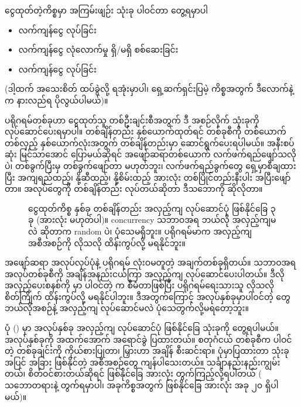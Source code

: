 ငွေထုတ်တဲ့ကိစ္စမှာ အကြမ်းဖျဉ်း  သုံးခု ပါဝင်တာ တွေ့ရမှာပါ 
%
\begin{itemize}
    \item လက်ကျန်ငွေ  လုပ်ခြင်း
    \item လက်ကျန်ငွေ လုံလောက်မှု ရှိ/မရှိ စစ်ဆေးခြင်း
    \item လက်ကျန်ငွေ  လုပ်ခြင်း
\end{itemize}
%
(ဒါ့ထက် အသေးစိတ် ထပ်ခွဲလို့ ရအုံးမှာပါ၊ ရှေ့ဆက်ရှင်းပြမဲ့ ကိစ္စအတွက် ဒီလောက်နဲ့က နားလည်ရ ပိုလွယ်ပါမယ်)။

 ပရိုဂရမ်တစ်ခုဟာ ငွေထုတ်သူ တစ်ဦးချင်းစီအတွက် ဒီ အစဉ်လိုက်  သုံးခုကို လုပ်ဆောင်ပေးရမှာပါ။ တစ်ချိန်တည်း နှစ်ယောက်ထုတ်ရင်  တစ်ခုစီကို တစ်ယောက် တစ်လှည့် နှစ်ယောက်လုံးအတွက် တစ်ချိန်တည်းမှာ ဆောင်ရွက်ပေးရပါမယ်။ အနီးစပ်ဆုံး မြင်သာအောင် ပြောမယ်ဆိုရင်  အဖျော်ဆရာတစ်ယောက် လက်ဖက်ရည်ဖျော်သလိုပဲ၊ တစ်ခွက်ပြီးမှ တစ်ခွက်ဖျော်တာ မဟုတ်ဘူး၊ လက်ဖက်ရည်ခွက်တွေ ရှေ့မှာစီချထားပြီး အကျရည်ထည့်၊ နို့ဆီထည့်၊ နို့စိမ်းထည့် အားလုံး တစ်ပြိုင်တည်းနီးပါး အပြီးဖျော်တာ။ အလုပ်တွေကို တစ်ချိန်တည်း လုပ်တယ်ဆိုတာ ဒီသဘောကို ဆိုလိုတာ။ 

\begin{figure}[!htb]
    \caption{ငွေထုတ်ကိစ္စ နှစ်ခု တစ်ချိန်တည်း အလှည့်ကျ လုပ်ဆောင်ပုံ ဖြစ်နိုင်ခြေ ၃ ခု (အားလုံး မဟုတ်ပါ)။ concurrency သဘာဝအရ ဘယ်လို အလှည့်ကျမလဲ ဆိုတာက random ပဲ၊ ပုံသေမရှိဘူး။ ပရိုဂရမ်မာက အလှည့်ကျ အစီအစဉ်ကို လိုသလို ထိန်းကွပ်လို့ မရနိုင်ဘူး။}
    \label{fig:accwithdrawconcur1}
\end{figure}



အဖျော်ဆရာ အလုပ်လုပ်ပုံနဲ့  ပရိုဂရမ် လုံးဝမတူတဲ့ အချက်တစ်ခုရှိတယ်။  သဘာဝအရ အလုပ်တစ်ခုစီကို အချိန်အနည်းငယ်ကြာ အလှည့်ကျ လုပ်ဆောင်ပေးပါတယ်။ ဒီလို အလှည့်ပေးစနစ်ကို  မှာ ပါဝင်တဲ့  က  စီမံတာဖြစ်ပြီး ပရိုဂရမ်ရေးသားသူ လိုသလို စိတ်ကြိုက် ထိန်းကွပ်လို့ မရနိုင်ပါဘူး။ ဒီအတွက်ကြောင့် အလုပ်နှစ်ခုမှာပါဝင်တဲ့  တွေ ဘယ်လိုအစဉ်နဲ့ အလှည့်ကျ လုပ်ဆောင်မလဲ ပုံသေတွက်လို့မရတော့ဘူး။  



ပုံ (\fRefNo{\ref{fig:accwithdrawconcur1}}) မှာ အလုပ်နှစ်ခု အလှည့်ကျ လုပ်ဆောင်ပုံ ဖြစ်နိုင်ခြေ သုံးခုကို တွေ့ရပါမယ်။ အလုပ်နှစ်ခုကို အထက်အောက် အရောင်ခွဲ ပြထားတယ်။ စတုဂံငယ် တစ်ခုစီက ပါဝင်တဲ့  တစ်ခုချင်းကို ကိုယ်စားပြုတာ၊ မြှားဟာ အချိန် စီးဆင်းရာ။ ပုံမှာပြထားတာ သုံးခုအပြင် အခြား ဖြစ်နိုင်တဲ့ အစီအစဉ်တွေ ကျန်ပါသေးတယ်။ သင်္ချာနည်းနည်းကျွမ်းတယ်၊ စိတ်ဝင်စားတယ်ဆိုရင် ဖြစ်နိုင်ခြေ အားလုံး တွက်ကြည့်လို့ရပါတယ် (   သဘောတရားနဲ့ တွက်ရမှာပါ၊ အခုကိစ္စအတွက် ဖြစ်နိုင်ခြေ အားလုံး အခု ၂၀ ရှိပါမယ်)။




